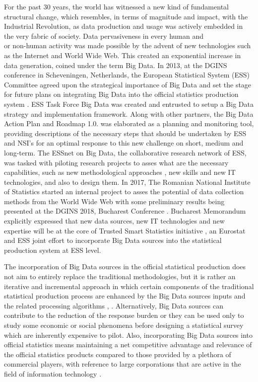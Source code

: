 \documentclass[]{article}
\begin{document}
For the past 30 years, the world has witnessed a new kind of fundamental structural change, which resembles, in terms of magnitude and impact, with the Industrial Revolution, as data production and usage was actively embedded in the very fabric of society. Data pervasiveness in every human and\\or non-human activity was made possible by the advent of new technologies such as the Internet and World Wide Web. This created an exponential increase in data generation, coined under the term Big Data. In 2013, at the DGINS conference in Scheveningen, Netherlands, the European Statistical System (ESS) Committee agreed upon the strategical importance of Big Data and set the stage for future plans on integrating Big Data into the official statistics production system \cite{mschv}. ESS Task Force Big Data was created and entrusted to setup a Big Data strategy and implementation framework. Along with other partners, the Big Data Action Plan and Roadmap 1.0. was elaborated as a planning and monitoring tool, providing descriptions of the necessary steps that should be undertaken by ESS and NSI's for an optimal response to this new challenge on short, medium and long-term. The ESSnet on Big Data, the collaborative research network of ESS, was tasked with piloting research projects \cite{awirth} to asses what are the necessary capabilities, such as new methodological approaches \cite{fricc}, new skills and new IT technologies, and also to design them. In 2017, The Romanian National Institute of Statistics started an internal project to asses the potential of data collection methods from the World Wide Web with some preliminary results being presented at the DGINS 2018, Bucharest Conference \cite{oancea}. Bucharest Memorandum \cite{mbch} explicitly expressed that new data sources, new IT technologies and new expertise will be at the core of Trusted Smart Statistics initiative \cite{ricwirskagiarei}, an Eurostat and ESS joint effort to incorporate Big Data sources into the statistical production system at ESS level.

The incorporation of Big Data sources in the official statistical production does not aim to entirely replace the traditional methodologies, but it is rather an iterative and incremental approach in which certain components of the traditional statistical production process are enhanced by the Big Data sources inputs and the related processing algorithms \cite{grif2016_1}, \cite{grif2016_2}. Alternatively, Big Data sources can contribute to the reduction of the response burden or they can be used only to study some economic or social phenomena before designing a statistical survey which are inherently expensive to pilot. Also, incorporating Big Data sources into official statistics means maintaining a net competitive advantage and relevance of the official statistics products compared to those provided by a plethora of commercial players, with reference to large corporations that are active in the field of information technology \cite{eu2012}.
\end{document}
